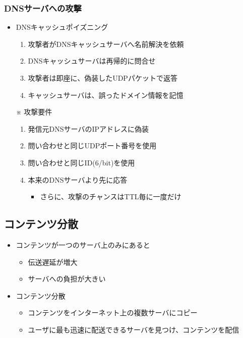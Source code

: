 \subsubsection{DNSサーバへの攻撃}
\begin{itemize}
  \item DNSキャッシュポイズニング
  \begin{enumerate}
    \item 攻撃者がDNSキャッシュサーバへ名前解決を依頼
    \item DNSキャッシュサーバは再帰的に問合せ
    \item 攻撃者は即座に、偽装したUDPパケットで返答
    \item キャッシュサーバは、誤ったドメイン情報を記憶
  \end{enumerate}
  \item[※] 攻撃要件
  \begin{enumerate}
    \item 発信元DNSサーバのIPアドレスに偽装
    \item 問い合わせと同じUDPポート番号を使用
    \item 問い合わせと同じID(6/bit)を使用
    \item 本来のDNSサーバより先に応答
    \begin{itemize}
      \item さらに、攻撃のチャンスはTTL毎に一度だけ
    \end{itemize}
  \end{enumerate}
\end{itemize}

\newpage
\subsection{コンテンツ分散}

\begin{itemize}
  \item コンテンツが一つのサーバ上のみにあると
  \begin{itemize}
    \item 伝送遅延が増大
    \item サーバへの負担が大きい
  \end{itemize}
  \item コンテンツ分散
  \begin{itemize}
    \item コンテンツをインターネット上の複数サーバにコピー
    \item ユーザに最も迅速に配送できるサーバを見つけ、コンテンツを配信
  \end{itemize}
\end{itemize}

